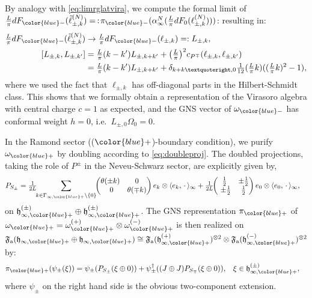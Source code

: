\documentclass[a4paper, 11pt]{article}
\newcommand{\ua}{\textup a}
\newcommand{\fF}{\mathfrak{F}}\newcommand{\cF}{\mathcal{F}}\newcommand{\dF}{\mathds{F}}\newcommand{\sF}{\mathscr{F}}
\newcommand{\fh}{\mathfrak{h}}
\DeclareMathOperator{\1}{\mathds{1}}
\begin{document}
By analogy with \eqref{eq:limrglatvira}, we compute the formal limit of $\tfrac{L}{\pi}dF_{{\color{blue}-}}(\tilde{\ell}^{(N)}_{\pm,k})=\!\ :\!\pi_{{\color{blue}-}}(\alpha^{N}_{\infty}(\tfrac{L}{\pi}dF_{0}(\ell^{(N)}_{\pm,k})))$: resulting in:
\begin{align}
\label{eq:viraCRcxrep}
\tfrac{L}{\pi}dF_{{\color{blue}-}}(\tilde{\ell}^{(N)}_{\pm,k}) & \rightarrow \tfrac{L}{\pi}dF_{{\color{blue}-}}(\ell_{\pm,k}) =: L_{\pm,k}, \\ \nonumber
[L_{\pm,k},L_{\pm,k'}] & = \tfrac{L}{\pi}(k-k')L_{\pm,k+k'} + \big(\tfrac{L}{\pi}\big)^{2}c_{P^{\mp}}(\ell_{\pm,k},\ell_{\pm,k'}) \\ \nonumber
& = \tfrac{L}{\pi}(k-k')L_{\pm,k+k'} + \delta_{k+k’,0}\tfrac{1}{12}(\tfrac{L}{\pi}k)((\tfrac{L}{\pi}k)^2-1),
\end{align}
where we used the fact that $\ell_{\pm,k}$ has off-diagonal parts in the Hilbert-Schmidt class. This shows that we formally obtain a representation of the Virasoro algebra with central charge $c=1$ as expected, and the GNS vector of $\omega_{{\color{blue}-}}$ has conformal weight $h=0$, i.e.~$L_{\pm,0}\Omega_{0} = 0$.

\bigskip

In the Ramond sector ((${\color{blue}+}$)-boundary condition), we purify $\omega_{{\color{blue}+}}$ by doubling according to \eqref{eq:doubleproj}. The doubled projections, taking the role of $P^{\pm}$ in the Neveu-Schwarz sector, are explicitly given by,
\begin{align}
\label{eq:doubleprojR}
P_{S_{\pm}} & = \tfrac{1}{2L}\!\!\sum_{k\in\Gamma_{\infty,{\color{blue}+}}\setminus\{0\}}\!\!\begin{pmatrix} \theta(\pm k) & 0 \\ 0 & \theta(\mp k) \end{pmatrix} e_{k}\otimes \langle e_{k},\!\ \cdot\!\ \rangle_{\infty} + \tfrac{1}{2L}\!\!\begin{pmatrix} \tfrac{1}{2} & \pm\tfrac{1}{2} \\ \pm\tfrac{1}{2} & \tfrac{1}{2} \end{pmatrix} e_{0}\otimes \langle e_{0},\!\ \cdot\!\ \rangle_{\infty},
\end{align}
on $\fh^{(\pm)}_{\infty,{\color{blue}+}}\oplus\fh^{(\pm)}_{\infty,{\color{blue}+}}$. The GNS representation $\pi_{{\color{blue}+}}$ of $\omega_{{\color{blue}+}} = \omega^{(+)}_{{\color{blue}+}}\otimes\omega^{(-)}_{{\color{blue}+}}$ is then realized on $\fF_{\ua}(\fh_{\infty,{\color{blue}+}}\oplus\fh_{\infty,{\color{blue}+}})\cong\fF_{\ua}(\fh^{(+)}_{\infty,{\color{blue}+}})^{\otimes 2}\otimes\fF_{\ua}(\fh^{(-)}_{\infty,{\color{blue}+}})^{\otimes 2}$ by:
\begin{align}
\label{eq:cxrepchiR}
\pi_{{\color{blue}+}}(\psi_{\pm}(\xi)) & = \psi_{\pm}(P_{S_{\pm}}(\xi\oplus0))+\psi^{\dag}_{\pm}((J\oplus J)P_{S_{\mp}}(\xi\oplus0)), & \xi & \in\fh^{(\pm)}_{\infty,{\color{blue}+}},
\end{align}
where $\psi_{\pm}$ on the right hand side is the obvious two-component extension.
\end{document}
